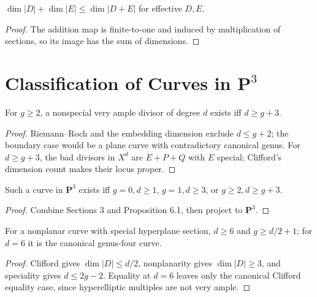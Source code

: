 \begin{lemma}\label{ha-ch4-l55}
\(\dim|D|+\dim|E|\le\dim|D+E|\) for effective \(D,E\).
\end{lemma}
\begin{proof}The addition map is finite-to-one and induced by multiplication of
sections, so its image has the sum of dimensions.\end{proof}

\section{Classification of Curves in \(\mathbf P^3\)}
\label{ha-ch4-s6}
\begin{proposition}[Halphen]\label{ha-ch4-p61}
For \(g\ge2\), a nonspecial very ample divisor of degree \(d\) exists iff
\(d\ge g+3\).
\end{proposition}
\begin{proof}Riemann--Roch and the embedding dimension exclude \(d\le g+2\);
the boundary case would be a plane curve with contradictory canonical genus.
For \(d\ge g+3\), the bad divisors in \(X^d\) are \(E+P+Q\) with \(E\)
special; Clifford's dimension count makes their locus proper.\end{proof}
\begin{corollary}\label{ha-ch4-c62}
Such a curve in \(\mathbf P^3\) exists iff \(g=0,d\ge1\), \(g=1,d\ge3\), or
\(g\ge2,d\ge g+3\).
\end{corollary}
\begin{proof}Combine Sections 3 and Proposition 6.1, then project to \(\mathbf P^3\).
\end{proof}
\begin{proposition}\label{ha-ch4-p63}
For a nonplanar curve with special hyperplane section, \(d\ge6\) and
\(g\ge d/2+1\); for \(d=6\) it is the canonical genus-four curve.
\end{proposition}
\begin{proof}Clifford gives \(\dim|D|\le d/2\), nonplanarity gives
\(\dim|D|\ge3\), and speciality gives \(d\le2g-2\).  Equality at \(d=6\)
leaves only the canonical Clifford equality case, since hyperelliptic multiples
are not very ample.\end{proof}
